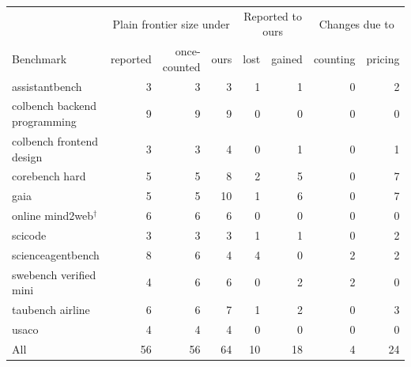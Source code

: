\begin{tabular}{lrrrrrrr}
\toprule
 & \multicolumn{3}{c}{Plain frontier size under} & \multicolumn{2}{c}{Reported to ours} & \multicolumn{2}{c}{Changes due to} \\
Benchmark & reported & once-counted & ours & lost & gained & counting & pricing \\
\midrule
assistantbench & 3 & 3 & 3 & 1 & 1 & 0 & 2 \\
colbench backend programming & 9 & 9 & 9 & 0 & 0 & 0 & 0 \\
colbench frontend design & 3 & 3 & 4 & 0 & 1 & 0 & 1 \\
corebench hard & 5 & 5 & 8 & 2 & 5 & 0 & 7 \\
gaia & 5 & 5 & 10 & 1 & 6 & 0 & 7 \\
online mind2web$^{\dagger}$ & 6 & 6 & 6 & 0 & 0 & 0 & 0 \\
scicode & 3 & 3 & 3 & 1 & 1 & 0 & 2 \\
scienceagentbench & 8 & 6 & 4 & 4 & 0 & 2 & 2 \\
swebench verified mini & 4 & 6 & 6 & 0 & 2 & 2 & 0 \\
taubench airline & 6 & 6 & 7 & 1 & 2 & 0 & 3 \\
usaco & 4 & 4 & 4 & 0 & 0 & 0 & 0 \\
\midrule
All & 56 & 56 & 64 & 10 & 18 & 4 & 24 \\
\bottomrule
\end{tabular}
